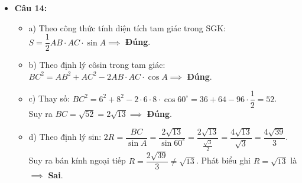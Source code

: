 \documentclass[12pt,a4paper]{article}
\begin{document}
\begin{itemize}[leftmargin=0.6cm, itemsep=1.5pt, topsep=1pt]
    \item \textbf{Câu 14:}
    \begin{itemize}[itemsep=1pt]
        \item a) Theo công thức tính diện tích tam giác trong SGK: $S = \dfrac{1}{2}AB \cdot AC \cdot \sin A \implies$ \textbf{Đúng}.
        \item b) Theo định lý côsin trong tam giác: $BC^2 = AB^2 + AC^2 - 2 AB \cdot AC \cdot \cos A \implies$ \textbf{Đúng}.
        \item c) Thay số: $BC^2 = 6^2 + 8^2 - 2 \cdot 6 \cdot 8 \cdot \cos 60^\circ = 36 + 64 - 96 \cdot \dfrac{1}{2} = 52$.\\
        Suy ra $BC = \sqrt{52} = 2\sqrt{13} \implies$ \textbf{Đúng}.
        \item d) Theo định lý sin: $2R = \dfrac{BC}{\sin A} = \dfrac{2\sqrt{13}}{\sin 60^\circ} = \dfrac{2\sqrt{13}}{\frac{\sqrt{3}}{2}} = \dfrac{4\sqrt{13}}{\sqrt{3}} = \dfrac{4\sqrt{39}}{3}$.\\
        Suy ra bán kính ngoại tiếp $R = \dfrac{2\sqrt{39}}{3} \ne \sqrt{13}$. Phát biểu ghi $R = \sqrt{13}$ là $\implies$ \textbf{Sai}.
    \end{itemize}
\end{itemize}
\end{document}
